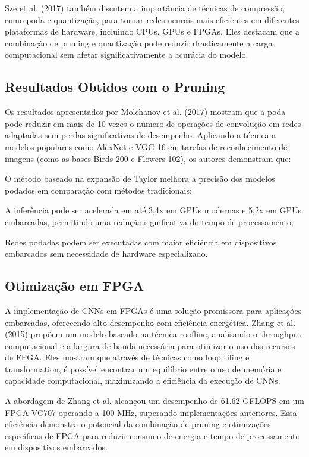 Sze et al. (2017) também discutem a importância de técnicas de compressão, como poda e quantização, para tornar redes neurais mais eficientes em diferentes plataformas de hardware, incluindo CPUs, GPUs e FPGAs. Eles destacam que a combinação de pruning e quantização pode reduzir drasticamente a carga computacional sem afetar significativamente a acurácia do modelo.

\subsection{Resultados Obtidos com o Pruning}

Os resultados apresentados por Molchanov et al. (2017) mostram que a poda pode reduzir em mais de 10 vezes o número de operações de convolução em redes adaptadas sem perdas significativas de desempenho. Aplicando a técnica a modelos populares como AlexNet e VGG-16 em tarefas de reconhecimento de imagens (como as bases Birds-200 e Flowers-102), os autores demonstram que:

O método baseado na expansão de Taylor melhora a precisão dos modelos podados em comparação com métodos tradicionais;

A inferência pode ser acelerada em até 3,4x em GPUs modernas e 5,2x em GPUs embarcadas, permitindo uma redução significativa do tempo de processamento;

Redes podadas podem ser executadas com maior eficiência em dispositivos embarcados sem necessidade de hardware especializado.

\subsection{Otimização em FPGA}

A implementação de CNNs em FPGAs é uma solução promissora para aplicações embarcadas, oferecendo alto desempenho com eficiência energética. Zhang et al. (2015) propõem um modelo baseado na técnica roofline, analisando o throughput computacional e a largura de banda necessária para otimizar o uso dos recursos de FPGA. Eles mostram que através de técnicas como loop tiling e transformation, é possível encontrar um equilíbrio entre o uso de memória e capacidade computacional, maximizando a eficiência da execução de CNNs.

A abordagem de Zhang et al. alcançou um desempenho de 61.62 GFLOPS em um FPGA VC707 operando a 100 MHz, superando implementações anteriores. Essa eficiência demonstra o potencial da combinação de pruning e otimizações específicas de FPGA para reduzir consumo de energia e tempo de processamento em dispositivos embarcados.

